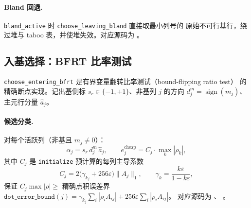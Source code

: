 \paragraph{Bland 回退.}
\texttt{bland\_active} 时 \texttt{choose\_leaving\_bland} 直接取最小列号的
原始不可行基行，绕过堆与 taboo 表，并使堆失效。对应源码为
。

\subsection{入基选择：BFRT 比率测试}
\label{subsec:engine-lp-bfrt}

\texttt{choose\_entering\_bfrt} 是有界变量翻转比率测试（bound-flipping ratio test）
的精确断点实现。记出基侧标 $s_r \in \{-1, +1\}$、非基列 $j$ 的方向
$d^{m}_j = \operatorname{sign}(m_j)$、主元行分量 $\hat a_j$。

\paragraph{候选分类.}
对每个活跃列（非基且 $m_j \ne 0$）：
\begin{equation}
  \alpha_j = s_r \, d^{m}_j \, \hat a_j,\qquad
  e^{\text{cheap}}_j = C_j \cdot \max_k |\rho_k|,
  \label{eq:lpkernel:bfrt-alpha}
\end{equation}
其中 $C_j$ 是 \texttt{initialize} 预计算的每列主导系数
\begin{equation}
  C_j = 2\bigl(\gamma_{k_j} + 256\varepsilon\bigr) \|A_j\|_1,\qquad
  \gamma_{k} = \frac{k\varepsilon}{1 - k\varepsilon},
  \label{eq:lpkernel:bfrt-coef}
\end{equation}
保证 $C_j \max|\rho| \ge$ 精确点积误差界
$\texttt{dot\_error\_bound}(j) = \gamma_{k_j} \sum_i |\rho_i A_{ij}| +
256\varepsilon \sum_i |\rho_i A_{ij}|$。
对应源码为 、
。

